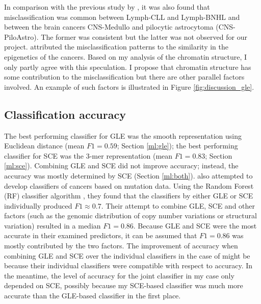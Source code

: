 In comparison with the previous study by \citet{Jiao2020}, it was also found that misclassification was common between Lymph-CLL and Lymph-BNHL and between the brain cancers CNS-Medullo and pilocytic astrocytoma (CNS-PiloAstro). The former was consistent but the latter was not observed for our project. \citet{Jiao2020} attributed the misclassification patterns to the similarity in the epigenetics of the cancers. Based on my analysis of the chromatin structure, I only partly agree with this speculation. I propose that chromatin structure has some contribution to the misclassification but there are other parallel factors involved. An example of such factors is illustrated in Figure \ref{fig:discussion_gle}.

\subsection{Classification accuracy}
The best performing classifier for GLE was the smooth representation using Euclidean distance (mean $F1=0.59$; Section \ref{ml:gle}); the best performing classifier for SCE was the 3-mer representation (mean $F1=0.83$; Section \ref{ml:sce}). Combining GLE and SCE did not improve accuracy; instead, the accuracy was mostly determined by SCE (Section \ref{ml:both}). \citet{Jiao2020} also attempted to develop classifiers of cancers based on mutation data. Using the Random Forest (RF) classifier algorithm \citep{Lindner2017AutomatedModels}, they found that the classifiers by either GLE or SCE individually produced $F1\approx0.7$. Their attempt to combine GLE, SCE and other factors (such as the genomic distribution of copy number variations or structural variation) resulted in a median $F1=0.86$. Because GLE and SCE were the most accurate in their examined predictors, it can be assumed that $F1=0.86$ was mostly contributed by the two factors. The improvement of accuracy when combining GLE and SCE over the individual classifiers in the case of \citet{Jiao2020} might be because their individual classifiers were compatible with respect to accuracy. In the meantime, the level of accuracy for the joint classifier in my case only depended on SCE, possibly because my SCE-based classifier was much more accurate than the GLE-based classifier in the first place. 

